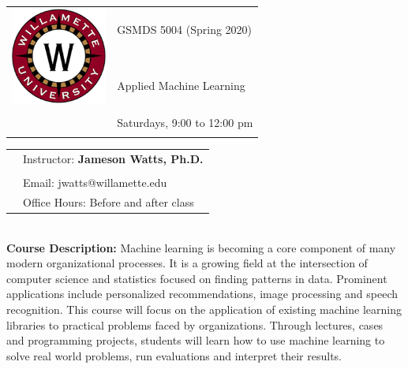 \documentclass[11pt]{article}
\begin{document}
\begin{tabular}{ l l }
  \multirow{3}{*}{\includegraphics[height=1.25in]{logo.png}} & \LARGE GSMDS 5004 (Spring 2020) \\\\
  &\large Applied Machine Learning \\\\
  & \large Saturdays, 9:00 to 12:00 pm\\\\
\end{tabular}
\vspace{10mm}

\begin{tabular}{ l l }
  & \large Instructor: \textbf{Jameson Watts, Ph.D.} \\\\
  & \large Email: jwatts@willamette.edu \\
  & \large Office Hours: Before and after class \\
\end{tabular}
\vspace{5mm}


\textbf {\large \\ Course Description:} Machine learning is becoming a core component of many modern organizational processes. It is a growing field at the intersection of computer science and statistics focused on finding patterns in data. Prominent applications include personalized recommendations, image processing and speech recognition. This course will focus on the application of existing machine learning libraries to practical problems faced by organizations. Through lectures, cases and programming projects, students will learn how to use machine learning to solve real world problems, run evaluations and interpret their results. \\
\end{document}
